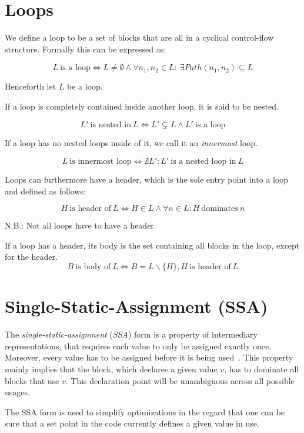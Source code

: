 
\section{Loops}\label{sec:basics:loops}

We define a loop to be a set of blocks that are all in a cyclical control-flow structure.
Formally this can be expressed as:

$$L~\text{is a loop} \Longleftrightarrow L \neq \emptyset \wedge \forall n_1, n_2 \in L:~\exists Path(n_1, n_2) \subseteq L$$

Henceforth let $L$ be a loop.

If a loop is completely contained inside another loop, it is said to be nested.

$$L'~\text{is nested in}~L \Longleftrightarrow L' \subsetneq L \wedge L'~\text{is a loop}$$

If a loop has no nested loops inside of it, we call it an \textit{innermost} loop.

$$L~\text{is innermost loop} \Longleftrightarrow \nexists L': L'~\text{is a nested loop in}~L$$

Loops can furthermore have a header, which is the sole entry point into a loop~\cite{aebi18bachelorarbeit} and defined as follows:

$$H~\text{is header of}~L \Longleftrightarrow H \in L \wedge \forall n \in L: H~\text{dominates}~n$$

N.B.: Not all loops have to have a header.

If a loop has a header, its body is the set containing all blocks in the loop, except for the header.
$$B~\text{is body of}~L \Longleftrightarrow B = L \backslash \{H\}, H~\text{is header of}~L$$

\section{Single-Static-Assignment (SSA)}\label{sec:basics:ssa}

The \textit{single-static-assignment} (\textit{SSA}) form is a property of intermediary representations, that requires each value to only be assigned exactly once.
Moreover, every value has to be assigned before it is being used~\cite{cytron91}.
This property mainly implies that the block, which declares a given value $v$, has to dominate all blocks that use $v$.
This declaration point will be unambiguous across all possible usages.

The SSA form is used to simplify optimizations in the regard that one can be sure that a set point in the code currently defines a given value in use.

